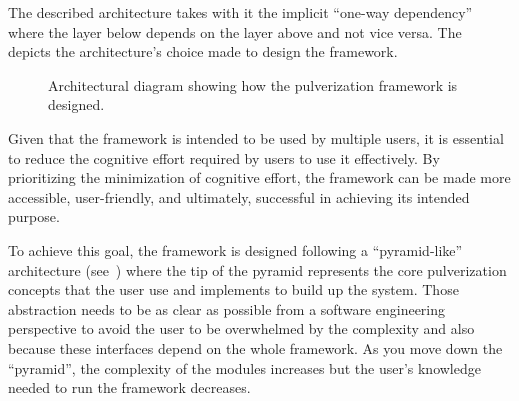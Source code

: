 The described architecture takes with it the implicit ``one-way dependency'' where the layer below depends on the layer above and not vice versa.
The~ depicts the architecture's choice made to design the framework.

\begin{figure}
	\centering
	\caption{Architectural diagram showing how the pulverization framework is designed.}
	\label{fig:framework-architecture}
\end{figure}

Given that the framework is intended to be used by multiple users, it is essential to reduce the cognitive effort required by users to
use it effectively. By prioritizing the minimization of cognitive effort, the framework can be made more accessible, user-friendly, and ultimately,
successful in achieving its intended purpose.

To achieve this goal, the framework is designed following a ``pyramid-like'' architecture (see~) where the tip of
the pyramid represents the core pulverization concepts that the user use and implements to build up the system.
Those abstraction needs to be as clear as possible from a software engineering perspective to avoid the user to be overwhelmed by the complexity
and also because these interfaces depend on the whole framework.
As you move down the ``pyramid'', the complexity of the modules increases but the user's knowledge needed to run the framework decreases.

